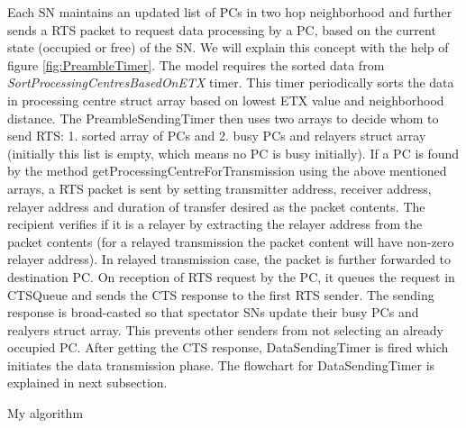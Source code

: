 	Each \ac{SN} maintains an updated list of \acp{PC} in two hop neighborhood and further sends a \ac{RTS} packet to request data processing by a \ac{PC}, based on the current state (occupied or free) of the \ac{SN}. We will explain this concept with the help of figure \ref{fig:PreambleTimer}. The model requires the sorted data from \textit{SortProcessingCentresBasedOnETX} timer. This timer periodically sorts the data in processing centre struct array based on lowest \ac{ETX} value and neighborhood distance. The PreambleSendingTimer then uses two arrays to decide whom to send \ac{RTS}: 1. sorted array of \acp{PC} and 2. busy \acp{PC} and relayers struct array (initially this list is empty, which means no \ac{PC} is busy initially). If a \ac{PC} is found by the method getProcessingCentreForTransmission using the above mentioned arrays, a \ac{RTS} packet is sent by setting transmitter address, receiver address, relayer address and duration of transfer desired as the packet contents. The recipient verifies if it is a relayer by extracting the relayer address from the packet contents (for a relayed transmission the packet content will have non-zero relayer address). In relayed transmission case, the packet is further forwarded to destination \ac{PC}. On reception of \ac{RTS} request by the \ac{PC}, it queues the request in CTSQueue and sends the \ac{CTS} response to the first \ac{RTS} sender. The sending response is broad-casted so that spectator \acp{SN} update their busy \acp{PC} and realyers struct array. This prevents other senders from not selecting an already occupied \ac{PC}. After getting the \ac{CTS} response, DataSendingTimer is fired which initiates the data transmission phase. The flowchart for DataSendingTimer is explained in next subsection.
	
    \makeatletter
    \def\BState{\State\hskip-\ALG@thistlm}
    \makeatother
    \begin{algorithm}
    \caption{My algorithm}\label{euclid}
    \end{algorithm}
    
